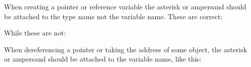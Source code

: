 \begin{DoxyItemize}
\item When creating a pointer or reference variable the asterisk or ampersand should be attached to the type name not the variable name. These are correct\+: 
\begin{DoxyCode}{0}
\DoxyCodeLine{}
\end{DoxyCode}
 While these are not\+: 
\begin{DoxyCode}{0}
\DoxyCodeLine{}
\end{DoxyCode}

\item When dereferencing a pointer or taking the address of some object, the asterisk or ampersand should be attached to the variable name, like this\+: 
\begin{DoxyCode}{0}
\DoxyCodeLine{}
\end{DoxyCode}


\end{DoxyItemize}
